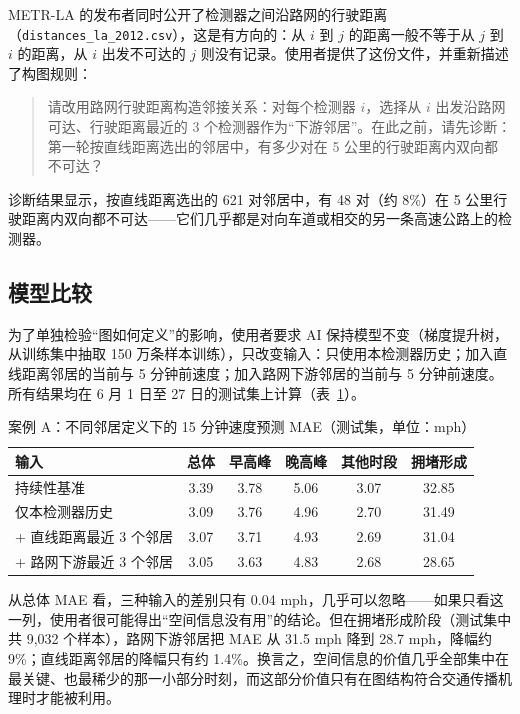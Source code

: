 METR-LA 的发布者同时公开了检测器之间沿路网的行驶距离（\texttt{distances\_la\_2012.csv}），这是有方向的：从 $i$ 到 $j$ 的距离一般不等于从 $j$ 到 $i$ 的距离，从 $i$ 出发不可达的 $j$ 则没有记录\cite{li2018dcrnn}。使用者提供了这份文件，并重新描述了构图规则：

\begin{quote}
请改用路网行驶距离构造邻接关系：对每个检测器 $i$，选择从 $i$ 出发沿路网可达、行驶距离最近的 3 个检测器作为“下游邻居”。在此之前，请先诊断：第一轮按直线距离选出的邻居中，有多少对在 5 公里的行驶距离内双向都不可达？
\end{quote}

诊断结果显示，按直线距离选出的 621 对邻居中，有 48 对（约 8\%）在 5 公里行驶距离内双向都不可达——它们几乎都是对向车道或相交的另一条高速公路上的检测器。

\subsection{模型比较}

为了单独检验“图如何定义”的影响，使用者要求 AI 保持模型不变（梯度提升树，从训练集中抽取 150 万条样本训练），只改变输入：只使用本检测器历史；加入直线距离邻居的当前与 5 分钟前速度；加入路网下游邻居的当前与 5 分钟前速度。所有结果均在 6 月 1 日至 27 日的测试集上计算（表~\ref{tab:ch9_gnn}）。

\begin{table}[H]
\centering
\caption{案例 A：不同邻居定义下的 15 分钟速度预测 MAE（测试集，单位：mph）}
\label{tab:ch9_gnn}
\begin{tabular}{lccccc}
\toprule
输入 & 总体 & 早高峰 & 晚高峰 & 其他时段 & 拥堵形成 \\
\midrule
持续性基准 & 3.39 & 3.78 & 5.06 & 3.07 & 32.85 \\
仅本检测器历史 & 3.09 & 3.76 & 4.96 & 2.70 & 31.49 \\
+ 直线距离最近 3 个邻居 & 3.07 & 3.71 & 4.93 & 2.69 & 31.04 \\
+ 路网下游最近 3 个邻居 & 3.05 & 3.63 & 4.83 & 2.68 & 28.65 \\
\bottomrule
\end{tabular}
\end{table}

从总体 MAE 看，三种输入的差别只有 0.04 mph，几乎可以忽略——如果只看这一列，使用者很可能得出“空间信息没有用”的结论。但在拥堵形成阶段（测试集中共 9,032 个样本），路网下游邻居把 MAE 从 31.5 mph 降到 28.7 mph，降幅约 9\%；直线距离邻居的降幅只有约 1.4\%。换言之，空间信息的价值几乎全部集中在最关键、也最稀少的那一小部分时刻，而这部分价值只有在图结构符合交通传播机理时才能被利用。

